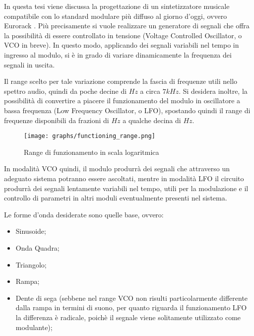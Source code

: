 

In questa tesi viene discussa la progettazione di un sintetizzatore musicale compatibile con
lo standard modulare più diffuso al giorno d'oggi, ovvero Eurorack \cite{eurorack}. Più
precisamente si vuole realizzare un generatore di segnali che offra la possibilità di essere
controllato in tensione (Voltage Controlled Oscillator, o VCO in breve). In questo modo,
applicando dei segnali variabili nel tempo in ingresso al modulo, si è in grado di variare
dinamicamente la frequenza dei segnali in uscita.

Il range scelto per tale variazione comprende la fascia di frequenze utili nello spettro
audio, quindi da poche decine di $Hz$ a circa $7kHz$. Si desidera inoltre, la possibilità di
convertire a piacere il funzionamento del modulo in oscillatore a bassa frequenza (Low Frequency
Oscillator, o LFO), spostando quindi il range di frequenze disponibili da frazioni di
$Hz$ a qualche decina di $Hz$.
\medskip

\begin{figure}[ht]
    \centering
    \texttt{[image: graphs/functioning\_range.png]}
    \caption{Range di funzionamento in scala logaritmica}
    \label{functioning_range}
\end{figure}

In modalità VCO quindi, il modulo produrrà dei segnali che attraverso un adeguato sistema
potranno essere ascoltati, mentre in modalità LFO il circuito produrrà dei segnali lentamente
variabili nel tempo, utili per la modulazione e il controllo di parametri in altri moduli
eventualmente presenti nel sistema.

Le forme d'onda desiderate sono quelle base, ovvero:

\begin{itemize}
    \item Sinusoide;
    \item Onda Quadra;
    \item Triangolo;
    \item Rampa;
    \item Dente di sega (sebbene nel range VCO non risulti particolarmente differente dalla
          rampa in termini di suono, per quanto riguarda il funzionamento LFO la differenza
          è radicale, poichè il segnale viene solitamente utilizzato come modulante);
\end{itemize}

